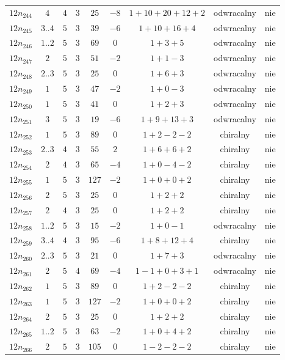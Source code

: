 \begin{longtable}{ccccccccc}
$12n_{244}$ & $4$ & $4$ & $3$ & $25$ & $-8$ & $1+10+20+12+2$ & odwracalny & nie \\
$12n_{245}$ & $3..4$ & $5$ & $3$ & $39$ & $-6$ & $1+10+16+4$ & odwracalny & nie \\
$12n_{246}$ & $1..2$ & $5$ & $3$ & $69$ & $0$ & $1+3+5$ & odwracalny & nie \\
$12n_{247}$ & $2$ & $5$ & $3$ & $51$ & $-2$ & $1+1-3$ & odwracalny & nie \\
$12n_{248}$ & $2..3$ & $5$ & $3$ & $25$ & $0$ & $1+6+3$ & odwracalny & nie \\
$12n_{249}$ & $1$ & $5$ & $3$ & $47$ & $-2$ & $1+0-3$ & odwracalny & nie \\
$12n_{250}$ & $1$ & $5$ & $3$ & $41$ & $0$ & $1+2+3$ & odwracalny & nie \\
$12n_{251}$ & $3$ & $5$ & $3$ & $19$ & $-6$ & $1+9+13+3$ & odwracalny & nie \\
$12n_{252}$ & $1$ & $5$ & $3$ & $89$ & $0$ & $1+2-2-2$ & chiralny & nie \\
$12n_{253}$ & $2..3$ & $4$ & $3$ & $55$ & $2$ & $1+6+6+2$ & chiralny & nie \\
$12n_{254}$ & $2$ & $4$ & $3$ & $65$ & $-4$ & $1+0-4-2$ & chiralny & nie \\
$12n_{255}$ & $1$ & $5$ & $3$ & $127$ & $-2$ & $1+0+0+2$ & chiralny & nie \\
$12n_{256}$ & $2$ & $5$ & $3$ & $25$ & $0$ & $1+2+2$ & chiralny & nie \\
$12n_{257}$ & $2$ & $4$ & $3$ & $25$ & $0$ & $1+2+2$ & chiralny & nie \\
$12n_{258}$ & $1..2$ & $5$ & $3$ & $15$ & $-2$ & $1+0-1$ & odwracalny & nie \\
$12n_{259}$ & $3..4$ & $4$ & $3$ & $95$ & $-6$ & $1+8+12+4$ & chiralny & nie \\
$12n_{260}$ & $2..3$ & $5$ & $3$ & $21$ & $0$ & $1+7+3$ & odwracalny & nie \\
$12n_{261}$ & $2$ & $5$ & $4$ & $69$ & $-4$ & $1-1+0+3+1$ & odwracalny & nie \\
$12n_{262}$ & $1$ & $5$ & $3$ & $89$ & $0$ & $1+2-2-2$ & chiralny & nie \\
$12n_{263}$ & $1$ & $5$ & $3$ & $127$ & $-2$ & $1+0+0+2$ & chiralny & nie \\
$12n_{264}$ & $2$ & $5$ & $3$ & $25$ & $0$ & $1+2+2$ & chiralny & nie \\
$12n_{265}$ & $1..2$ & $5$ & $3$ & $63$ & $-2$ & $1+0+4+2$ & chiralny & nie \\
$12n_{266}$ & $2$ & $5$ & $3$ & $105$ & $0$ & $1-2-2-2$ & chiralny & nie \\

\end{longtable}
